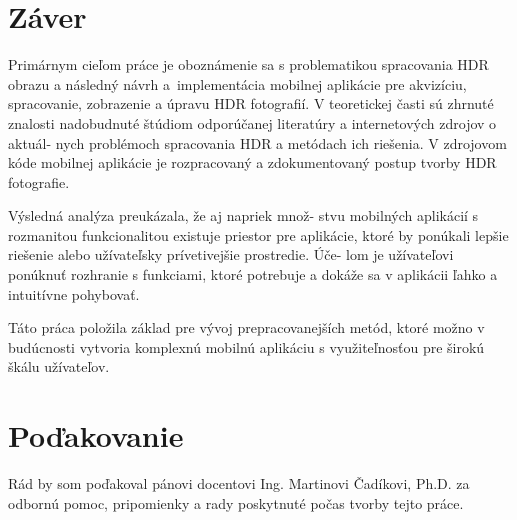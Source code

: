 \documentclass[slovak]{ExcelAtFIT}
\begin{document}
\section{Záver}
\label{sec:Conclusion}

Primárnym cieľom práce je oboznámenie sa s problematikou spracovania HDR obrazu a následný návrh 
a~implementácia mobilnej aplikácie pre akvizíciu, spracovanie, zobrazenie a úpravu HDR fotografií.
V teoretickej časti sú zhrnuté znalosti nadobudnuté štúdiom odporúčanej literatúry a internetových
zdrojov o aktuál- nych problémoch spracovania HDR a metódach ich riešenia. V zdrojovom kóde mobilnej 
aplikácie je rozpracovaný a zdokumentovaný postup tvorby HDR fotografie.

Výsledná analýza preukázala, že aj napriek množ- stvu mobilných aplikácií s rozmanitou funkcionalitou
existuje priestor pre aplikácie, ktoré by ponúkali lepšie riešenie alebo užívateľsky prívetivejšie
prostredie. Úče- lom je užívateľovi ponúknuť rozhranie s funkciami, ktoré potrebuje a dokáže sa v aplikácii
ľahko a intuitívne pohybovať.

Táto práca položila základ pre vývoj prepracovanejších metód, ktoré možno v budúcnosti vytvoria komplexnú
mobilnú aplikáciu s využiteľnosťou pre širokú škálu užívateľov.

\section*{Poďakovanie}
Rád by som poďakoval pánovi docentovi Ing. Martinovi Čadíkovi, Ph.D. za odbornú pomoc, pripomienky a rady
poskytnuté počas tvorby tejto práce.




\end{document}
